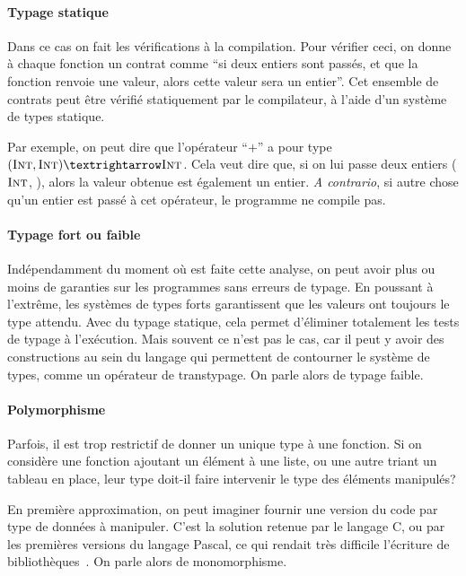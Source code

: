 \paragraph{Typage statique}

Dans ce cas on fait les vérifications à la compilation. Pour vérifier ceci, on
donne à chaque fonction un contrat comme \enquote{si deux entiers sont passés,
et que la fonction renvoie une valeur, alors cette valeur sera un entier}. Cet
ensemble de contrats peut être vérifié statiquement par le compilateur, à l'aide
d'un système de types statique.

Par exemple, on peut dire que l'opérateur \enquote{$+$} a pour type $(\tInt,
\tInt) → \tInt$. Cela veut dire que, si on lui passe deux entiers ($\textsc{Int}$,
\tInt), alors la valeur obtenue est également un entier. \emph{A contrario}, si
autre chose qu'un entier est passé à cet opérateur, le programme ne compile pas.

\paragraph{Typage fort ou faible}

Indépendamment du moment où est faite cette analyse, on peut avoir plus ou moins
de garanties sur les programmes sans erreurs de typage. En poussant à l'extrême,
les systèmes de types forts garantissent que les valeurs ont toujours le type
attendu. Avec du typage statique, cela permet d'éliminer totalement les tests de
typage à l'exécution. Mais souvent ce n'est pas le cas, car il peut y avoir des
constructions au sein du langage qui permettent de contourner le système de
types, comme un opérateur de transtypage. On parle alors de typage faible.

\paragraph{Polymorphisme}

Parfois, il est trop restrictif de donner un unique type à une fonction. Si on
considère une fonction ajoutant un élément à une liste, ou une autre
triant un tableau en place, leur type doit-il faire intervenir le type des
éléments manipulés?

En première approximation, on peut imaginer fournir une version du code par type
de données à manipuler. C'est la solution retenue par le langage C, ou par les
premières versions du langage Pascal, ce qui rendait très difficile l'écriture
de bibliothèques~\cite{PascalNoEscape}. On parle alors de monomorphisme.

